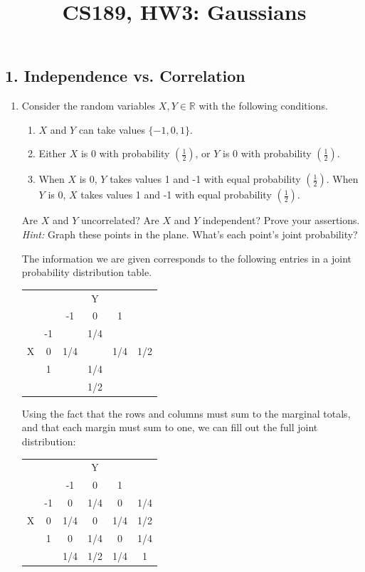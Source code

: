 \documentclass{article}
\title{CS189, HW3: Gaussians}
\renewcommand{\R}{\mathbb{R}}
\begin{document}
\maketitle

\subsection*{1. Independence vs. Correlation}
\begin{enumerate}[label=(\alph*)]
    \item Consider the random variables $X, Y \in \R$ with the following conditions.
    \begin{enumerate}[label=(\roman*)]
        \item $X$ and $Y$ can take values $\{-1, 0, 1\}$.
        \item Either $X$ is 0 with probability $(\frac{1}{2})$, or $Y$ is 0 with probability $(\frac{1}{2})$.
        \item When $X$ is 0, $Y$ takes values 1 and -1 with equal probability $(\frac{1}{2})$. When $Y$ is 0, $X$ takes values 1 and -1 with equal probability $(\frac{1}{2})$.
    \end{enumerate}

    Are $X$ and $Y$ uncorrelated? Are $X$ and $Y$ independent? Prove your
    assertions. \emph{Hint:} Graph these points in the plane. What’s each
    point’s joint probability?

    \begin{mdframed}
      The information we are given corresponds to the following entries in a
      joint probability distribution table.

      \begin{tabular}{c | c | c | c | c | c}
        &    &     & Y   &     & \\
        &    &  -1 & 0   &   1 & \\
        \hline
        & -1 &     & 1/4 &     & \\
        X &  0 & 1/4 &     & 1/4 & 1/2 \\
        &  1 &     & 1/4 &     & \\
        \hline
        &    &     & 1/2 &     & \\
      \end{tabular}

      Using the fact that the rows and columns must sum to the marginal totals,
      and that each margin must sum to one, we can fill out the full joint
      distribution:

      \begin{tabular}{c | c | c | c | c | c}
        &    &     & Y   &     & \\
        &    &  -1 & 0   &   1 & \\
        \hline
        & -1 & 0   & 1/4 & 0   & 1/4\\
      X &  0 & 1/4 & 0   & 1/4 & 1/2 \\
        &  1 &  0  & 1/4 & 0   & 1/4 \\
        \hline
        &    & 1/4 & 1/2 & 1/4 & 1 \\
      \end{tabular}


\end{mdframed}
\end{enumerate}
\end{document}
